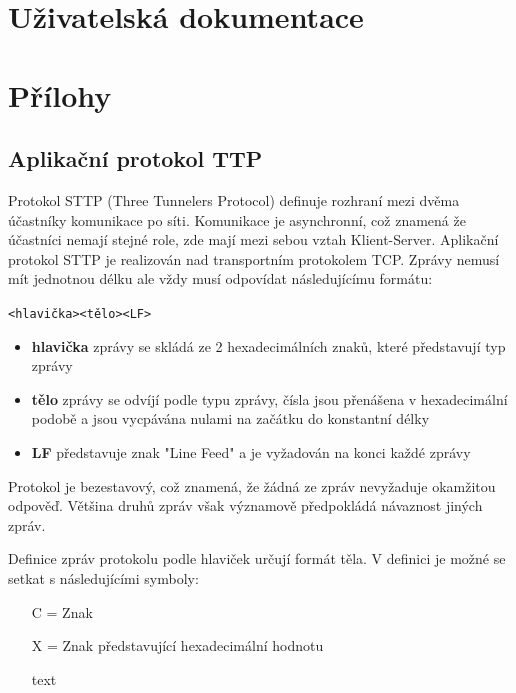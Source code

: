 \documentclass[12pt,a4paper]{article}
\let\oldsection\section
\renewcommand\section{\clearpage\oldsection}
\begin{document}
\section{Uživatelská dokumentace}


\section{Přílohy}
\subsection{Aplikační protokol TTP}
Protokol STTP (Three Tunnelers Protocol) definuje rozhraní mezi dvěma účastníky komunikace po síti. Komunikace je asynchronní, což znamená že účastníci nemají stejné role, zde mají mezi sebou vztah Klient-Server.
Aplikační protokol STTP je realizován nad transportním protokolem TCP. Zprávy nemusí mít jednotnou délku ale vždy musí odpovídat následujícímu formátu:
\begin{center}
\texttt{<hlavička><tělo><LF>}
\end{center}
\begin{itemize}
\setlength\itemsep{0em}
\item \textbf{hlavička} zprávy se skládá ze 2 hexadecimálních znaků, které představují typ zprávy
\item \textbf{tělo} zprávy se odvíjí podle typu zprávy, čísla jsou přenášena v hexadecimální podobě a jsou vycpávána nulami na začátku do konstantní délky
\item \textbf{LF} představuje znak "Line Feed" a je vyžadován na konci každé zprávy
\end{itemize}

Protokol je bezestavový, což znamená, že žádná ze zpráv nevyžaduje okamžitou odpověď. Většina druhů zpráv však významově předpokládá návaznost jiných zpráv.

Definice zpráv protokolu podle hlaviček určují formát těla. V definici je možné se setkat s následujícími symboly:
\begin{itemize}
\item[C] = Znak
\item[X] = Znak představující hexadecimální hodnotu
\item[text]
\end{itemize}
\end{document}

